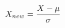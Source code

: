 \documentclass[preview]{standalone}
\begin{document}
\begin{align*}
\special{dvisvgm:raw <g id='unique000'>}X_{new} = \frac{X - \mu}{\sigma}\special{dvisvgm:raw </g>}
\end{align*}
\end{document}
